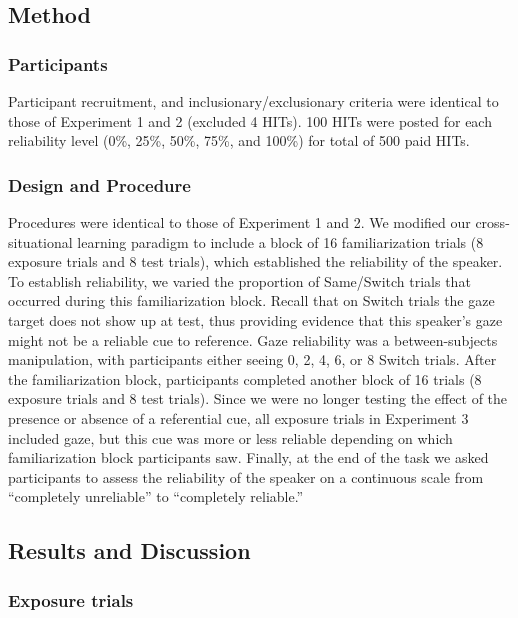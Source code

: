 \documentclass[authoryear, review]{elsarticle}
\begin{document}
\subsection{Method}\label{method-2}

\subsubsection{Participants}\label{participants-2}

Participant recruitment, and inclusionary/exclusionary criteria were
identical to those of Experiment 1 and 2 (excluded 4 HITs). 100 HITs
were posted for each reliability level (0\%, 25\%, 50\%, 75\%, and
100\%) for total of 500 paid HITs.

\subsubsection{Design and Procedure}\label{design-and-procedure-2}

Procedures were identical to those of Experiment 1 and 2. We modified
our cross-situational learning paradigm to include a block of 16
familiarization trials (8 exposure trials and 8 test trials), which
established the reliability of the speaker. To establish reliability, we
varied the proportion of Same/Switch trials that occurred during this
familiarization block. Recall that on Switch trials the gaze target does
not show up at test, thus providing evidence that this speaker's gaze
might not be a reliable cue to reference. Gaze reliability was a
between-subjects manipulation, with participants either seeing 0, 2, 4,
6, or 8 Switch trials. After the familiarization block, participants
completed another block of 16 trials (8 exposure trials and 8 test
trials). Since we were no longer testing the effect of the presence or
absence of a referential cue, all exposure trials in Experiment 3
included gaze, but this cue was more or less reliable depending on which
familiarization block participants saw. Finally, at the end of the task
we asked participants to assess the reliability of the speaker on a
continuous scale from ``completely unreliable'' to ``completely
reliable.''

\subsection{Results and Discussion}\label{results-and-discussion-2}

\subsubsection{Exposure trials}\label{exposure-trials-2}
\end{document}
